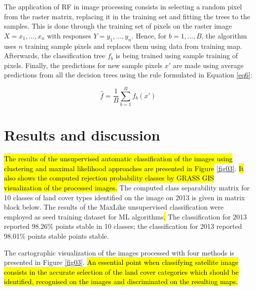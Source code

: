 \documentclass[final,5p,times,twocolumn]{elsarticle}
\begin{document}
The application of RF in image processing consists in selecting a random pixel from the raster matrix, replacing it in the training set and fitting the trees to the samples. This is done through the training set of pixels on the raster image $X = x_{1},\dots, x_{n}$ with responses $Y = y_{1}, \dots, y_{n}$. Hence, for $b = 1, \dots, B$, the algorithm uses $n$ training sample pixels and replaces them using data from training map. Afterwards, the classification tree $f_b$ is being trained using sample training of pixels. Finally, the predictions for new sample pixels $x'$ are made using average predictions from all the decision trees using the rule formulated in Equation \ref{eq6}: 

\begin{equation}
\hat f=\frac{1}{B}\sum_{b=1}^{B}f_{b}(x')
\label{eq6}
\end{equation}

\section{Results and discussion}

\hl{The results of the unsupervised automatic classification of the images using clustering and maximal likelihood approaches are presented in Figure} \ref{fig03}. \hl{It also shows the computed rejection probability classes by GRASS GIS visualization of the processed images.} The computed class separability matrix for 10 classes of land cover types identified on the image on 2013 is given in matrix block below. The results of the MaxLike unsupervised classification were employed as seed training dataset for ML algorithms\hl{. }The classification for 2013 reported 98.26\% points stable in 10 classes; the classification for 2013 reported 98.01\% points stable points stable. 

The cartographic visualization of the images processed with four methods is presented in Figure \ref{fig03}. \hl{An essential point when classifying satellite image consists in the accurate selection of the land cover categories which should be identified, recognised on the images and discriminated on the resulting maps. }
\end{document}
